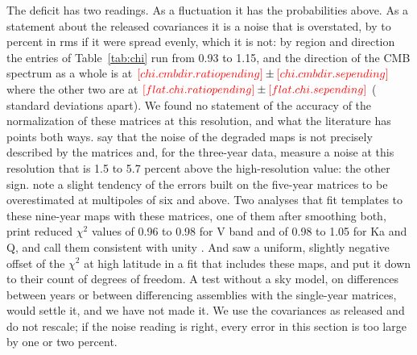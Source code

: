 The deficit has two readings. As a fluctuation it has the probabilities above. As a statement about
the released covariances it is a noise that is overstated, by  to
 percent in rms if it were spread evenly, which it is not: by region and
direction the entries of Table~\ref{tab:chi} run from 0.93 to 1.15, and the direction of the CMB
spectrum as a whole is at $\N{chi.cmbdir.ratio} \pm \N{chi.cmbdir.se}$ where the other two are at
$\N{flat.chi.ratio} \pm \N{flat.chi.se}$ ( standard deviations apart). We found
no statement of the accuracy of the normalization of these matrices at this resolution, and what the
literature has points both ways. \citet{jarosik2007} say that the noise of the degraded maps is not
precisely described by the matrices and, for the three-year data, measure a noise at this resolution
that is 1.5 to 5.7 percent above the high-resolution value: the other sign. \citet{hinshaw2009} note
a slight tendency of the errors built on the five-year matrices to be overestimated at multipoles of
six and above. Two analyses that fit templates to these nine-year maps with these matrices, one of
them after smoothing both, print reduced $\chi^2$ values of 0.96 to 0.98 for V band and of 0.98 to
1.05 for Ka and Q, and call them consistent with unity \citep{lattanzi2017,planck2018v}. And
\citet{svalheim2023} saw a uniform, slightly negative offset of the $\chi^2$ at high latitude in a
fit that includes these maps, and put it down to their count of degrees of freedom. A test without a
sky model, on differences between years or between differencing assemblies with the single-year
matrices, would settle it, and we have not made it. We use the covariances as released and do not
rescale; if the noise reading is right, every error in this section is too large by one or two
percent.

